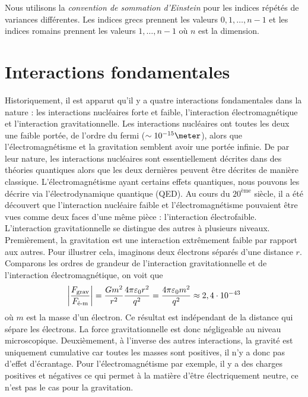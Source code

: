 \documentclass[a4paper,11pt]{report}
\begin{document}
        Nous utilisons la \textit{convention de sommation d'Einstein} pour les indices répétés de variances différentes. Les indices grecs prennent les valeurs $0,1,\dots,n-1$ et les indices romains prennent les valeurs $1,\dots,n-1$ où $n$ est la dimension.

    \section{Interactions fondamentales}
    
        Historiquement, il est apparut qu'il y a quatre interactions fondamentales dans la nature : les interactions nucléaires forte et faible, l'interaction électromagnétique et l'interaction gravitationnelle. Les interactions nucléaires ont toutes les deux une faible portée, de l'ordre du fermi ($\sim10^{-15}\meter$), alors que  l'électromagnétisme et la gravitation semblent avoir une portée infinie. De par leur nature, les interactions nucléaires sont essentiellement décrites dans des théories quantiques alors que les deux dernières peuvent être décrites de manière classique. L'électromagnétisme ayant certains effets quantiques, nous pouvons les décrire via l'électrodynamique quantique (QED). Au cours du $20^{\text{ème}}$ siècle, il a été découvert que l'interaction nucléaire faible et l'électromagnétisme pouvaient être vues comme deux faces d'une même pièce : l'interaction électrofaible.\\
        
        L'interaction gravitationnelle se distingue des autres à plusieurs niveaux. Premièrement, la gravitation est une interaction extrêmement faible par rapport aux autres. Pour illustrer cela, imaginons deux électrons séparés d'une distance $r$. Comparons les ordres de grandeur de l'interaction gravitationnelle et de l'interaction électromagnétique, on voit que
        \begin{equation}
            \abs{\frac{F_{\text{grav}}}{F_{\text{é-m}}}} = \frac{Gm^2}{r^2}\frac{4\pi\varepsilon_0r^2}{q^2} = \frac{4\pi\varepsilon_0 m^2}{q^2} \approx 2,4\cdot10^{-43}
        \end{equation}
        où $m$ est la masse d'un électron. Ce résultat est indépendant de la distance qui sépare les électrons. La force gravitationnelle est donc négligeable au niveau microscopique. Deuxièmement, à l'inverse des autres interactions, la gravité est uniquement cumulative car toutes les masses sont positives, il n'y a donc pas d'effet d'écrantage. Pour l'électromagnétisme par exemple, il y a des charges positives et négatives ce qui permet à la matière d'être électriquement neutre, ce n'est pas le cas pour la gravitation.\\
        
\end{document}
